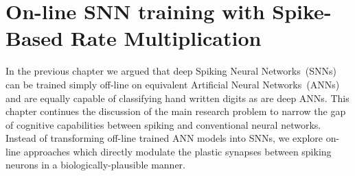 \chapter[On-line SNN training with SRM]{On-line SNN training with Spike-Based Rate Multiplication}
\label{cha:sdlm}
In the previous chapter we argued that deep Spiking Neural Networks~(SNNs) can be trained simply off-line on equivalent Artificial Neural Networks~(ANNs) and are equally capable of classifying hand written digits as are deep ANNs.
This chapter continues the discussion of the main research problem to narrow the gap of cognitive capabilities between spiking and conventional neural networks.
Instead of transforming off-line trained ANN models into SNNs, we explore on-line approaches which directly modulate the plastic synapses between spiking neurons in a biologically-plausible manner.


